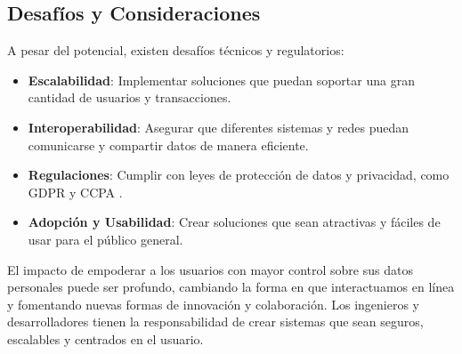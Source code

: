 \subsection{Desafíos y Consideraciones}

A pesar del potencial, existen desafíos técnicos y regulatorios:

\begin{itemize}
    \item \textbf{Escalabilidad}: Implementar soluciones que puedan soportar una gran cantidad de usuarios y transacciones.
    \item \textbf{Interoperabilidad}: Asegurar que diferentes sistemas y redes puedan comunicarse y compartir datos de manera eficiente.
    \item \textbf{Regulaciones}: Cumplir con leyes de protección de datos y privacidad, como GDPR y CCPA \cite{finck2018blockchain}.
    \item \textbf{Adopción y Usabilidad}: Crear soluciones que sean atractivas y fáciles de usar para el público general.
\end{itemize}

El impacto de empoderar a los usuarios con mayor control sobre sus datos personales puede ser profundo, cambiando la forma en que interactuamos en línea y fomentando nuevas formas de innovación y colaboración. Los ingenieros y desarrolladores tienen la responsabilidad de crear sistemas que sean seguros, escalables y centrados en el usuario.

